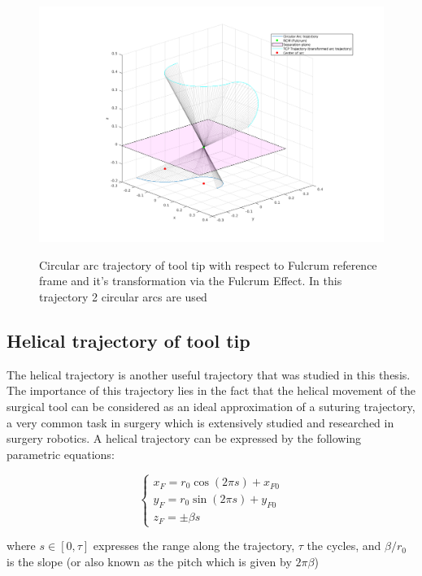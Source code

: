\begin{center}
\begin{figure}[htbp]
\centering
\includegraphics[width=\textwidth]{images/rcm_trajectories/rcm_arcs_traj.png}\\
\caption{Circular arc trajectory of tool tip with respect to Fulcrum reference frame and it's transformation via the Fulcrum Effect. In this trajectory 2 circular arcs are used}
\end{figure}
\end{center}

\subsection{Helical trajectory of tool tip}

The helical trajectory is another useful trajectory that was studied in this thesis. The importance of this trajectory lies in the fact that the helical movement of the surgical tool can be considered as an ideal 
approximation of a suturing trajectory, a very common task in surgery which is extensively studied and researched in surgery robotics. A helical trajectory can be expressed by the following parametric equations:

\begin{equation}
\begin{cases}
x^{}_{F} = r_0\cos(2πs) + x^{}_{F0} \\
y^{}_{F} = r_0\sin(2πs) + y^{}_{F0} \\
z^{}_{F} = \pm βs
\end{cases}
\end{equation}

where $s \in \left[ 0, τ \right]$ expresses the range along the trajectory, $τ$ the cycles, and $β/r_0$ is the slope (or also known as the pitch which is given by $2πβ$)


